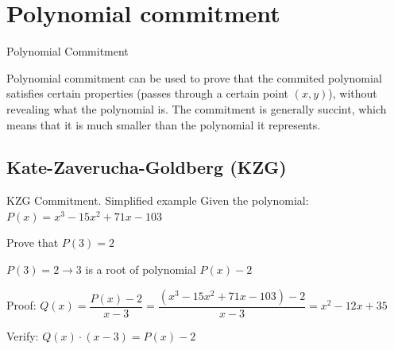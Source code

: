 \documentclass{zkdl-presentation-template}
\begin{document}
    \section{Polynomial commitment}

    \begin{frame}{Polynomial Commitment}

        \begin{definition}
            Polynomial commitment can be used to prove that the commited polynomial satisfies certain properties 
            (passes through a certain point $(x,y)$), without revealing what the polynomial is.
            The commitment is generally succint, which means that it is much smaller than the polynomial it represents.        
        \end{definition}
        

    \end{frame}

    \subsection{Kate-Zaverucha-Goldberg (KZG)}
    
    \begin{frame}{KZG Commitment. Simplified example}
        Given the polynomial: $P(x) = x^3 - 15x^2 + 71x - 103$
        
        \vspace{0.5 cm}

        Prove that $P(3) = 2$

        \vspace{0.5 cm}
         
        $P(3) = 2 \rightarrow 3$ is a root of polynomial $P(x) - 2$

        \vspace{0.5 cm}

        Proof: $Q(x) = \dfrac{P(x) - 2}{x-3} = \dfrac{(x^3 - 15x^2 + 71x - 103) - 2}{x-3} = x^2 - 12x+ 35$

        \vspace{0.5 cm}

        Verify: $Q(x) \cdot (x-3) = P(x) - 2$
    \end{frame}
\end{document}
